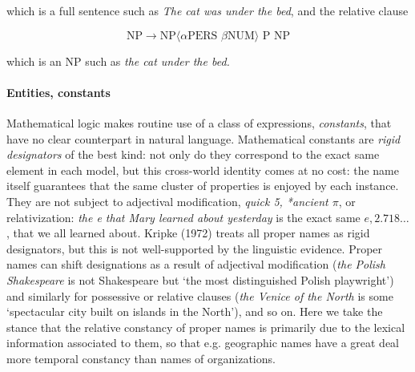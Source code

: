 \noindent
which is a full sentence such as {\it The cat was under the bed}, and the
relative clause

\begin{equation}
\text{NP} \rightarrow \text{NP$\langle$}\alpha\text{PERS } \beta\text{NUM$\rangle$ P NP}
\end{equation}

\noindent
which is an NP such as {\it the cat under the bed.} 

\paragraph{Entities, constants}

Mathematical logic makes routine use of a class of expressions, {\it
  constants}, that have no clear counterpart in natural language. Mathematical
constants are {\it rigid designators} of the best kind: not only do they
\nocite{Kripke:1972}correspond to the exact same
element in each model, but this cross-world identity comes at no cost: the
name itself guarantees that the same cluster of properties is enjoyed by each
instance. They are not subject to adjectival modification, {\it *quick 5,
  *ancient $\pi$}, or relativization: {\it the e that Mary learned about
  yesterday} is the exact same $e, 2.718\ldots$, that we all learned
about. Kripke (1972) treats all proper names as rigid designators, but this is
not well-supported by the linguistic evidence. Proper names can shift
designations as a result of adjectival modification ({\it the Polish
  Shakespeare} is not Shakespeare but `the most distinguished Polish
playwright') and similarly for possessive or relative clauses ({\it the Venice
  of the North} is some `spectacular city built on islands in the North'), and
so on. Here we take the stance that the relative constancy of proper names is
primarily due to the lexical information associated to them, so that e.g.
geographic names have a great deal more temporal constancy than names of
organizations.


